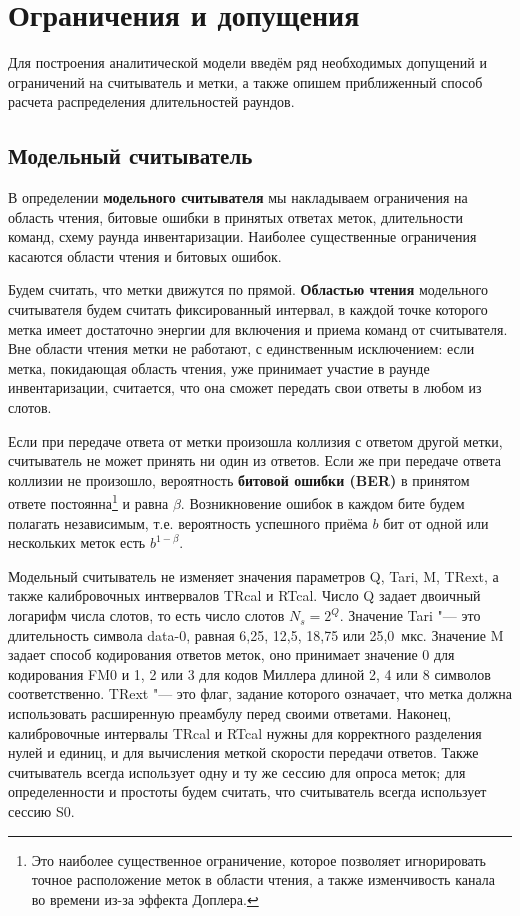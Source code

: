 \section{Ограничения и допущения}\label{sec:ch3_assumptions}
Для построения аналитической модели введём ряд необходимых допущений и ограничений на считыватель и метки, а также опишем приближенный способ расчета распределения длительностей раундов.


\subsection{Модельный считыватель}
В определении \textbf{модельного считывателя} мы накладываем ограничения на область чтения, битовые ошибки в принятых ответах меток, длительности команд, схему раунда инвентаризации. Наиболее существенные ограничения касаются области чтения и битовых ошибок.

Будем считать, что метки движутся по прямой. \textbf{Областью чтения} модельного считывателя будем считать фиксированный интервал, в каждой точке которого метка имеет достаточно энергии для включения и приема команд от считывателя. Вне области чтения метки не работают, с единственным исключением: если метка, покидающая область чтения, уже принимает участие в раунде инвентаризации, считается, что она сможет передать свои ответы в любом из слотов.

Если при передаче ответа от метки произошла коллизия с ответом другой метки, считыватель не может принять ни один из ответов. Если же при передаче ответа коллизии не произошло, вероятность \textbf{битовой ошибки (BER)} в принятом ответе постоянна\footnote{Это наиболее существенное ограничение, которое позволяет игнорировать точное расположение меток в области чтения, а также изменчивость канала во времени из-за эффекта Доплера.} и равна $\beta$. Возникновение ошибок в каждом бите будем полагать независимым, т.е. вероятность успешного приёма $b$ бит от одной или нескольких меток есть $b^{1 - \beta}$.

Модельный считыватель не изменяет значения параметров Q, Tari, M, TRext, а также калибровочных интвервалов TRcal и RTcal. Число Q задает двоичный логарифм числа слотов, то есть число слотов $N_s = 2^Q$. Значение Tari "--- это длительность символа data-0, равная 6,25, 12,5, 18,75 или 25,0~мкс. Значение M задает способ кодирования ответов меток, оно принимает значение 0 для кодирования FM0 и 1, 2 или 3 для кодов Миллера длиной 2, 4 или 8 символов соответственно. TRext "--- это флаг, задание которого означает, что метка должна использовать расширенную преамбулу перед своими ответами. Наконец, калибровочные интервалы TRcal и RTcal нужны для корректного разделения нулей и единиц, и для вычисления меткой скорости передачи ответов. Также считыватель всегда использует одну и ту же сессию для опроса меток; для определенности и простоты будем считать, что считыватель всегда использует сессию S0.

